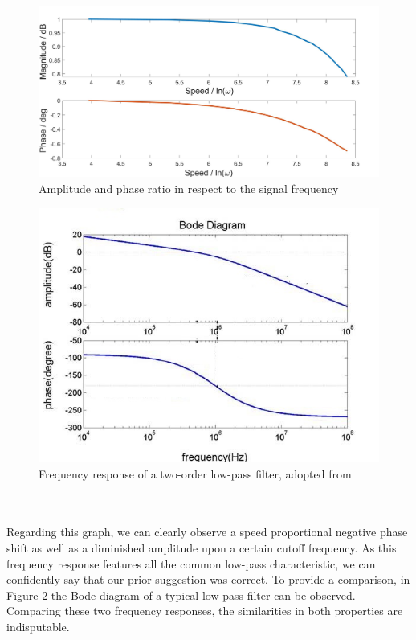 \documentclass[english]{isasthesis}
\begin{document}
   			\begin{figure}[p]
    		\begin{center}
    			\includegraphics[scale=0.22]{figures/bode.jpg}   
  			\end{center}
    		\caption{Amplitude and phase ratio in respect to the signal frequency}
    		\label{fig:bode}
    		\end{figure} 
    		\begin{figure}[p]
    		\begin{center}
    			\includegraphics[width=1\textwidth]{figures/bode_reference.jpg}   
  			\end{center}
    		\caption{Frequency response of a two-order low-pass filter, adopted from \citep{liang2008study}}
    		\label{fig:bode reference}
    		\end{figure}
   		\\\\Regarding this graph, we can clearly observe a speed proportional negative phase shift as well as a diminished amplitude upon a certain cutoff frequency. As this frequency response features all the common low-pass characteristic, we can confidently say that our prior suggestion was correct. To provide a comparison, in Figure \ref{fig:bode reference} the Bode diagram of a typical low-pass filter can be observed. Comparing these two frequency responses, the similarities in both properties are indisputable. 
\end{document}
